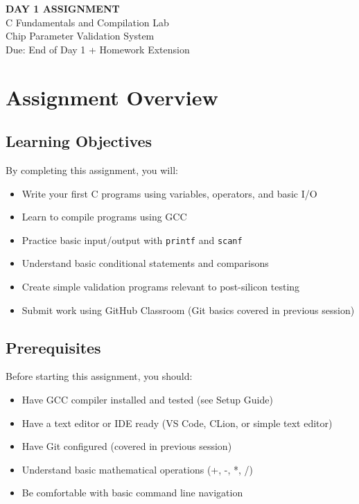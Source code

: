 \documentclass[11pt,a4paper]{article}
\begin{document}
\begin{center}
    {\Huge\bfseries\color{codeblue} DAY 1 ASSIGNMENT}\\[0.5cm]
    {\Large C Fundamentals and Compilation Lab}\\[0.3cm]
    {\large Chip Parameter Validation System}\\[0.2cm]
    {\normalsize Due: End of Day 1 + Homework Extension}
\end{center}

\vspace{1cm}

\section{Assignment Overview}

\subsection{Learning Objectives}
By completing this assignment, you will:
\begin{itemize}
    \item Write your first C programs using variables, operators, and basic I/O
    \item Learn to compile programs using GCC
    \item Practice basic input/output with \texttt{printf} and \texttt{scanf}
    \item Understand basic conditional statements and comparisons
    \item Create simple validation programs relevant to post-silicon testing
    \item Submit work using GitHub Classroom (Git basics covered in previous session)
\end{itemize}

\subsection{Prerequisites}
Before starting this assignment, you should:
\begin{itemize}
    \item Have GCC compiler installed and tested (see Setup Guide)
    \item Have a text editor or IDE ready (VS Code, CLion, or simple text editor)
    \item Have Git configured (covered in previous session)
    \item Understand basic mathematical operations (+, -, *, /)
    \item Be comfortable with basic command line navigation
\end{itemize}
\end{document}
